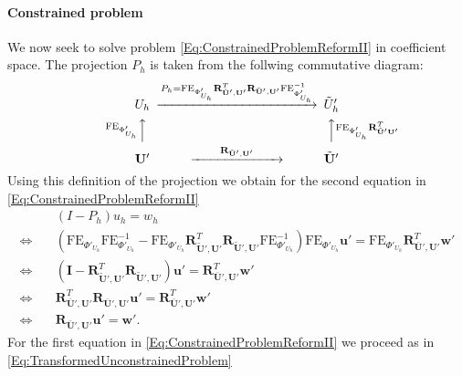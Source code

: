 \paragraph{Constrained problem} We now seek to solve problem
\eqref{Eq:ConstrainedProblemReformII} in coefficient space. The
projection $P_h$ is taken from the follwing commutative diagram:
\begin{equation*}
\begin{CD}
U_h @>{P_h = \text{FE}_{\Phi'_{U_h}}
\mathbf{R}^T_{\tilde{\mathbf{U}}',\mathbf{U}'}
\mathbf{R}_{\tilde{\mathbf{U}}',\mathbf{U}'} 
\text{FE}_{\Phi'_{U_h}}^{-1}}>> \tilde{U}_h'\\
@A{\text{FE}_{\Phi'_{U_h}}}AA @AA{\text{FE}_{\Phi'_{U_h}}
\mathbf{R}^T_{\tilde{\mathbf{U}}'\mathbf{U}'}}A\\
\mathbf{U}' @>{\qquad\mathbf{R}_{\tilde{\mathbf{U}}',\mathbf{U}'}\qquad}>> \tilde{\mathbf{U}}' 
\end{CD}
\end{equation*}
Using this definition of the projection we obtain for the second
equation in \eqref{Eq:ConstrainedProblemReformII}  
\begin{equation}\label{Eq:SideConditionCoefficient}
\begin{split}
&(I-P_h) u_h = w_h \\
\Leftrightarrow \quad & 
\left(\text{FE}_{\Phi'_{U_h}}\text{FE}_{\Phi'_{U_h}}^{-1}
- \text{FE}_{\Phi'_{U_h}}
\mathbf{R}^T_{\tilde{\mathbf{U}}',\mathbf{U}'}
\mathbf{R}_{\tilde{\mathbf{U}}',\mathbf{U}'} 
\text{FE}_{\Phi'_{U_h}}^{-1}\right)\text{FE}_{\Phi'_{U_h}}\mathbf{u}'
= \text{FE}_{\Phi'_{U_h}}
\mathbf{R}^T_{\bar{\mathbf{U}}',\mathbf{U}'} \mathbf{w}'\\
\Leftrightarrow \quad &
\left( \mathbf{I} - \mathbf{R}^T_{\tilde{\mathbf{U}}',\mathbf{U}'}
\mathbf{R}_{\tilde{\mathbf{U}}',\mathbf{U}'}\right) \mathbf{u}' =
\mathbf{R}^T_{\bar{\mathbf{U}}',\mathbf{U}'} \mathbf{w}' \\
\Leftrightarrow \quad &
\mathbf{R}^T_{\bar{\mathbf{U}}',\mathbf{U}'}
\mathbf{R}_{\bar{\mathbf{U}}',\mathbf{U}'} \mathbf{u}' =
\mathbf{R}^T_{\bar{\mathbf{U}}',\mathbf{U}'} \mathbf{w}'\\
\Leftrightarrow \quad &
\mathbf{R}_{\bar{\mathbf{U}}',\mathbf{U}'} \mathbf{u}' = \mathbf{w}' .
\end{split}
\end{equation}
For the first equation in \eqref{Eq:ConstrainedProblemReformII} 
we proceed as in \eqref{Eq:TransformedUnconstrainedProblem}
